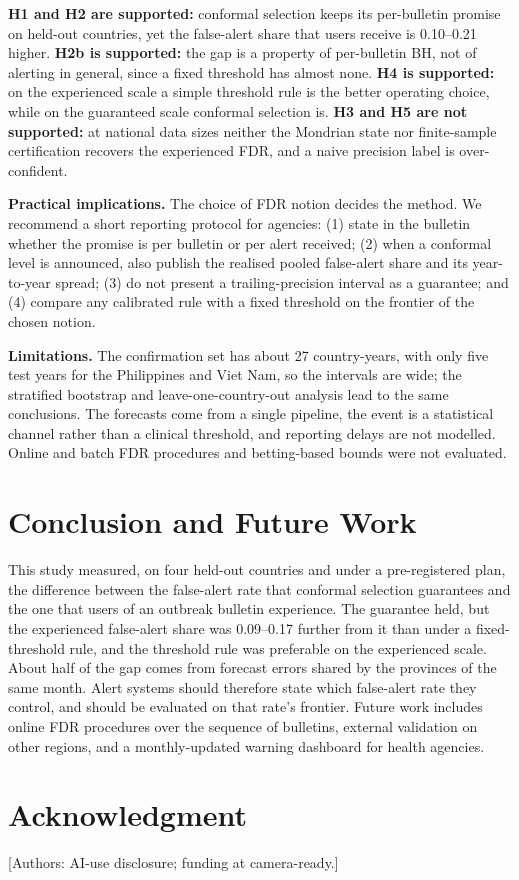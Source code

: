 \documentclass[conference]{IEEEtran}
\begin{document}
\textbf{H1 and H2 are supported:} conformal selection keeps its per-bulletin promise on held-out countries, yet the false-alert share that users receive is 0.10--0.21 higher. \textbf{H2b is supported:} the gap is a property of per-bulletin BH, not of alerting in general, since a fixed threshold has almost none. \textbf{H4 is supported:} on the experienced scale a simple threshold rule is the better operating choice, while on the guaranteed scale conformal selection is. \textbf{H3 and H5 are not supported:} at national data sizes neither the Mondrian state nor finite-sample certification recovers the experienced FDR, and a naive precision label is over-confident.

\textbf{Practical implications.} The choice of FDR notion decides the method. We recommend a short reporting protocol for agencies: (1) state in the bulletin whether the promise is per bulletin or per alert received; (2) when a conformal level is announced, also publish the realised pooled false-alert share and its year-to-year spread; (3) do not present a trailing-precision interval as a guarantee; and (4) compare any calibrated rule with a fixed threshold on the frontier of the chosen notion.

\textbf{Limitations.} The confirmation set has about 27 country-years, with only five test years for the Philippines and Viet Nam, so the intervals are wide; the stratified bootstrap and leave-one-country-out analysis lead to the same conclusions. The forecasts come from a single pipeline, the event is a statistical channel rather than a clinical threshold, and reporting delays are not modelled. Online and batch FDR procedures \cite{javanmard2018,zrnic2020} and betting-based bounds \cite{waudbysmith2024} were not evaluated.

\section{Conclusion and Future Work}
This study measured, on four held-out countries and under a pre-registered plan, the difference between the false-alert rate that conformal selection guarantees and the one that users of an outbreak bulletin experience. The guarantee held, but the experienced false-alert share was 0.09--0.17 further from it than under a fixed-threshold rule, and the threshold rule was preferable on the experienced scale. About half of the gap comes from forecast errors shared by the provinces of the same month. Alert systems should therefore state which false-alert rate they control, and should be evaluated on that rate's frontier. Future work includes online FDR procedures over the sequence of bulletins, external validation on other regions, and a monthly-updated warning dashboard for health agencies.


\section*{Acknowledgment}
[Authors: AI-use disclosure; funding at camera-ready.]



\end{document}
